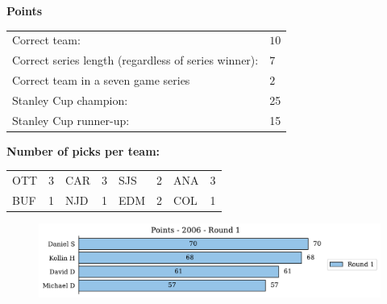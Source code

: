 \documentclass[10pt]{article}
\begin{document}
{\bf Points}\\
\begin{minipage}{12cm}
    \begin{tabular}{l l}
        Correct team:	& $10$\\
        Correct series length (regardless of series winner):	& $7$\\
        Correct team in a seven game series    & $2$\\
        Stanley Cup champion:	& 25\\
        Stanley Cup runner-up:	& 15\\
    \end{tabular}

    \vspace{1cm}
    {\bf Number of picks per team:}\\
    \begin{tabular}{lc | lc | lc | lc }
        OTT & 3 & CAR & 3 & SJS & 2 & ANA & 3 \\
        BUF & 1 & NJD & 1 & EDM & 2 & COL & 1 \\
    \end{tabular}
\end{minipage}
\begin{minipage}[t]{13cm}
    \begin{figure}[H]
        \vspace{-2.5cm}
        \includegraphics[width=13cm]{../../figures/2006/Points-2006-Round1.pdf}
    \end{figure}
\end{minipage}
\end{document}
